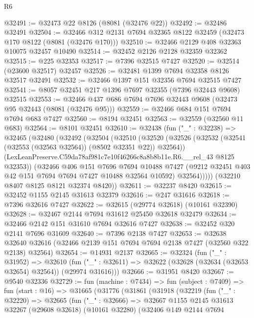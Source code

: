 \begin{lexlean}{R6}
\begin{coremodule}
@32491 := @32473 @22 @8126 (@8081 (@32476 @22))
@32492 := @32486 @32491
@32504 := @32466 @312 @2131 @7694 @32365 @8122 @32459 (@32473 @170 @8122 (@8081 (@32476 @170)))
@32510 := @32466 @2129 @408 @32363 @10075 @32457 @10490
@32514 := @32452 @2126 @2128 @32359 @32362
@32515 := @225 @32353
@32517 := @7396 @32515 @7427
@32520 := @32514 (@23600 @32517) @32457
@32526 := @32481 @1399 @7694 @32358 @8126 @32517 @32491
@32532 := @32466 @1397 @151 @32356 @7694 @32515 @7427
@32541 := @8057 @32451 @217 @1396 @7697 @32355 (@7396 @32443 @9608) @32515
@32553 := @32466 @437 @686 @7694 @7696 @32443 @9608 (@32473 @95 @32443 (@8081 (@32476 @95)))
@32559 := @32466 @684 @151 @7694 @7694 @683 @7427
@32560 := @8194 @32451
@32563 := @32559 (@32560 @11 @683)
@32564 := @8101 @32451
@32610 := @32438
    (fun ("_" : @32238) =>
    @32465
      (@32480
        (@32492
          (@32504
            (@32510
              (@32520
                (@32526 (@32532 (@32541 (@32553 (@32563 @32564)) (@8502 @32351 @22)) @32564))
                (LexLeanPreserve.C59da78af981c7e10f46266c8a8b8b11e.R6.__rel_43 @8125 @32353))
              (@32466
                @406
                @151
                @7696
                @7694
                @10488
                @7427
                (@9212 @32451 @403 @42 @151 @7694 @7694 @7427 @10488 @32564 @10592)
                @32564)))))
      (@32210 @8407 @8125 @8121 @32374 @8420))
@32611 := @32237 @8420
@32615 := @32452 @1155 @2145 @31613 @32379
@32616 := @247 @31616
@32618 := @7396 @32616 @7427
@32622 := @32615 (@29774 @32618) (@10161 @32390)
@32628 := @32467 @2144 @7694 @31612 @25450 @32618 @32479
@32634 := @32466 @2142 @151 @31610 @7694 @32616 @7427
@32638 := @32452 @320 @2141 @7696 @31609
@32640 := @7396 @2138 @7427
@32653 := @32638
    @32640
    @32616
    (@32466 @2139 @151 @7694 @7694 @2138 @7427 (@32560 @322 @2138) @32564)
@32654 := @14931 @2137
@32665 := @32324
    (fun ("_" : @31952) =>
    @32610 (fun ("_" : @32611) => @32622 (@32628 (@32634 (@32653 @32654) @32564)) (@29974 @31616)))
@32666 := @31951 @8420
@32667 := @9540 @32336
@32729 := fun (machine : @7434) =>
  fun (subject : @7409) =>
  fun (start : @16) =>
  @31665
    (@31776
      (@31861
        (@31918
          (@32219
            (fun ("_" : @32220) =>
            @32665
              (fun ("_" : @32666) =>
              @32667
                @1155
                @2145
                @31613
                @32267
                (@29608 @32618)
                (@10161 @32280)
                (@32406
                  @149
                  @2144
                  @7694

\end{coremodule}
\end{lexlean}
